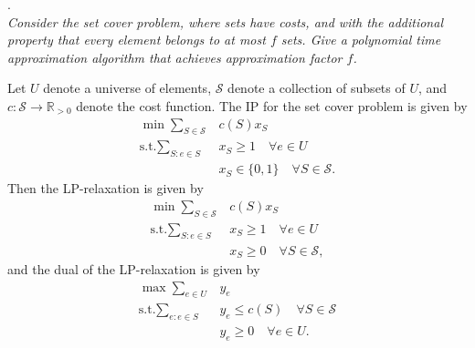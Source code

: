 \documentclass[a4paper,11pt]{article}
\begin{document}
. \\
\emph{Consider the set cover problem, where sets have costs, 
and with the additional property that {\em every element belongs to at most} $f$ {\em sets}. 
Give a polynomial time approximation algorithm that achieves approximation factor $f$.} \par
Let $U$ denote a universe of elements, $\mathcal{S}$ denote a collection of subsets of $U$, and $c : \mathcal{S} \to \mathbb{R}_{> 0}$ denote the cost function. The IP for the set cover problem is given by
\begin{align*}
    \min \sum_{S \in \mathcal{S}} &c(S) x_S \\
    \text{s.t.} \sum_{S : e \in S} &x_S \geq 1 \quad \forall e \in U \\
    &x_S \in \{ 0, 1 \} \quad \forall S \in \mathcal{S}.
\end{align*}
Then the LP-relaxation is given by
\begin{align*}
    \min \sum_{S \in \mathcal{S}} &c(S) x_S \\
    \text{s.t.} \sum_{S : e \in S} &x_S \geq 1 \quad \forall e \in U \\
    &x_S \geq 0 \quad \forall S \in \mathcal{S},
\end{align*}
and the dual of the LP-relaxation is given by
\begin{align*}
    \max \sum_{e \in U} &y_e \\
    \text{s.t.} \sum_{e : e \in S} &y_e \leq c(S) \quad \forall S \in \mathcal{S} \\
    &y_e \geq 0 \quad \forall e \in U.
\end{align*}
\end{document}
